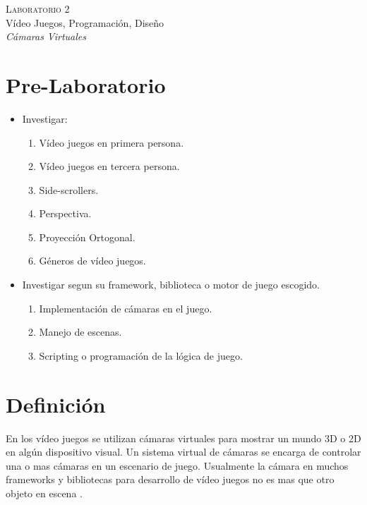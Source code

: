 \begin{center}
\textsc{\Large Laboratorio 2}~\\
{\large Vídeo Juegos, Programación, Diseño}~\\
\emph{Cámaras Virtuales}
\end{center}

\section{Pre-Laboratorio}
\begin{itemize}
\item Investigar:
\begin{enumerate}
  \item Vídeo juegos en primera persona.
  \item Vídeo juegos en tercera persona.
  \item Side-scrollers.
  \item Perspectiva.
  \item Proyección Ortogonal.
  \item Géneros de vídeo juegos.
\end{enumerate}
\item Investigar segun su framework, biblioteca o motor de juego escogido.
\begin{enumerate}
	\item Implementación de cámaras en el juego.
	\item Manejo de escenas.
	\item Scripting o programación de la lógica de juego.
\end{enumerate}
\end{itemize}
\section{Definición}
En los vídeo juegos se utilizan cámaras virtuales para mostrar un mundo 3D o 2D en algún dispositivo visual. Un sistema virtual de cámaras se encarga de controlar una o mas cámaras en un escenario de juego. Usualmente la cámara en muchos frameworks y bibliotecas para desarrollo de vídeo juegos no es mas que otro objeto en escena \cite{fund_gamedesign}.
